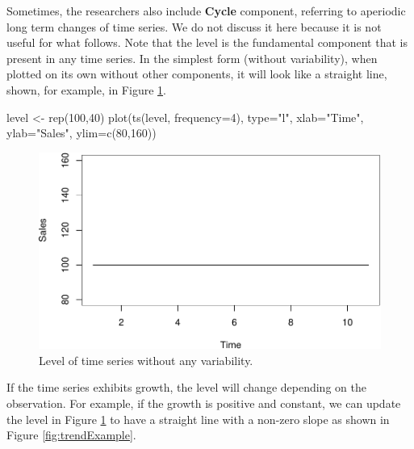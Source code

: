 \documentclass[
]{book}
\newenvironment{Shaded}{\begin{snugshade}}{\end{snugshade}}
\newcommand{\AttributeTok}[1]{\textcolor[rgb]{0.77,0.63,0.00}{#1}}
\newcommand{\DecValTok}[1]{\textcolor[rgb]{0.00,0.00,0.81}{#1}}
\newcommand{\FunctionTok}[1]{\textcolor[rgb]{0.00,0.00,0.00}{#1}}
\newcommand{\NormalTok}[1]{#1}
\newcommand{\OtherTok}[1]{\textcolor[rgb]{0.56,0.35,0.01}{#1}}
\newcommand{\StringTok}[1]{\textcolor[rgb]{0.31,0.60,0.02}{#1}}
\theoremstyle{definition}
\theoremstyle{definition}
\theoremstyle{definition}
\theoremstyle{definition}
\theoremstyle{remark}
\begin{document}
Sometimes, the researchers also include \textbf{Cycle} component, referring to aperiodic long term changes of time series. We do not discuss it here because it is not useful for what follows. Note that the level is the fundamental component that is present in any time series. In the simplest form (without variability), when plotted on its own without other components, it will look like a straight line, shown, for example, in Figure \ref{fig:levelExample}.

\begin{Shaded}
\begin{Highlighting}[]
\NormalTok{level }\OtherTok{\textless{}{-}} \FunctionTok{rep}\NormalTok{(}\DecValTok{100}\NormalTok{,}\DecValTok{40}\NormalTok{)}
\FunctionTok{plot}\NormalTok{(}\FunctionTok{ts}\NormalTok{(level, }\AttributeTok{frequency=}\DecValTok{4}\NormalTok{),}
     \AttributeTok{type=}\StringTok{"l"}\NormalTok{, }\AttributeTok{xlab=}\StringTok{"Time"}\NormalTok{, }\AttributeTok{ylab=}\StringTok{"Sales"}\NormalTok{, }\AttributeTok{ylim=}\FunctionTok{c}\NormalTok{(}\DecValTok{80}\NormalTok{,}\DecValTok{160}\NormalTok{))}
\end{Highlighting}
\end{Shaded}

\begin{figure}
\centering
\includegraphics{Svetunkov--2022----ADAM_files/figure-latex/levelExample-1.pdf}
\caption{\label{fig:levelExample}Level of time series without any variability.}
\end{figure}

If the time series exhibits growth, the level will change depending on the observation. For example, if the growth is positive and constant, we can update the level in Figure \ref{fig:levelExample} to have a straight line with a non-zero slope as shown in Figure \ref{fig:trendExample}.
\end{document}
